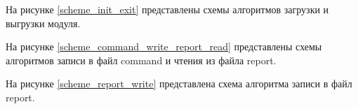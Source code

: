 На рисунке \ref{scheme_init_exit} представлены схемы алгоритмов загрузки и выгрузки модуля.


\clearpage

На рисунке \ref{scheme_command_write_report_read} представлены схемы алгоритмов записи в файл command и чтения из файла report.


\clearpage

На рисунке \ref{scheme_report_write} представлена схема алгоритма записи в файл report.



